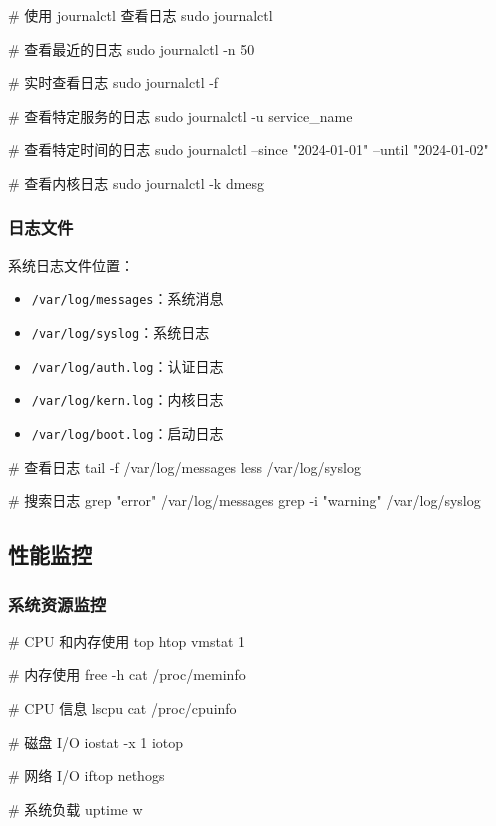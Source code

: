 
\begin{lstcode}[numbers=none]
  # 使用 journalctl 查看日志
  sudo journalctl

  # 查看最近的日志
  sudo journalctl -n 50

  # 实时查看日志
  sudo journalctl -f

  # 查看特定服务的日志
  sudo journalctl -u service_name

  # 查看特定时间的日志
  sudo journalctl --since "2024-01-01" --until "2024-01-02"

  # 查看内核日志
  sudo journalctl -k
  dmesg
\end{lstcode}

\subsubsection{日志文件}

系统日志文件位置：

\begin{itemize}
  \item \lstinline{/var/log/messages}：系统消息
  \item \lstinline{/var/log/syslog}：系统日志
  \item \lstinline{/var/log/auth.log}：认证日志
  \item \lstinline{/var/log/kern.log}：内核日志
  \item \lstinline{/var/log/boot.log}：启动日志
\end{itemize}


\begin{lstcode}[numbers=none]
  # 查看日志
  tail -f /var/log/messages
  less /var/log/syslog

  # 搜索日志
  grep "error" /var/log/messages
  grep -i "warning" /var/log/syslog
\end{lstcode}

\subsection{性能监控}

\subsubsection{系统资源监控}


\begin{lstcode}[numbers=none]
  # CPU 和内存使用
  top
  htop
  vmstat 1

  # 内存使用
  free -h
  cat /proc/meminfo

  # CPU 信息
  lscpu
  cat /proc/cpuinfo

  # 磁盘 I/O
  iostat -x 1
  iotop

  # 网络 I/O
  iftop
  nethogs

  # 系统负载
  uptime
  w
\end{lstcode}

